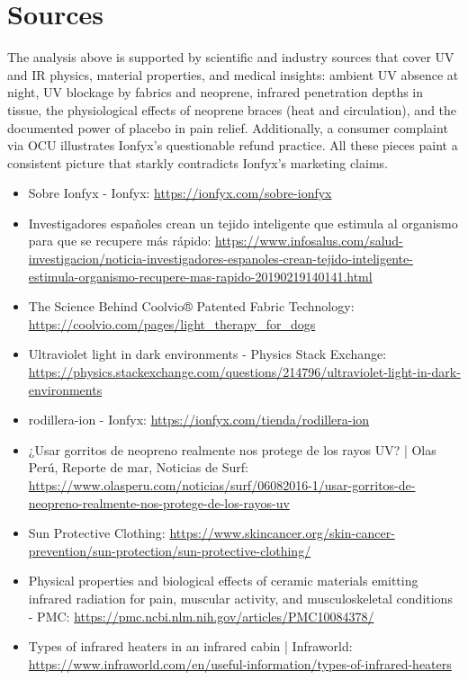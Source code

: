 \documentclass{article}
\begin{document}
\section*{Sources}
The analysis above is supported by scientific and industry sources that cover UV and IR physics, material properties, and medical insights: ambient UV absence at night, UV blockage by fabrics and neoprene, infrared penetration depths in tissue, the physiological effects of neoprene braces (heat and circulation), and the documented power of placebo in pain relief. Additionally, a consumer complaint via OCU illustrates Ionfyx's questionable refund practice. All these pieces paint a consistent picture that starkly contradicts Ionfyx's marketing claims.

\begin{itemize}
    \item Sobre Ionfyx - Ionfyx: \url{https://ionfyx.com/sobre-ionfyx}
    \item Investigadores españoles crean un tejido inteligente que estimula al organismo para que se recupere más rápido: \url{https://www.infosalus.com/salud-investigacion/noticia-investigadores-espanoles-crean-tejido-inteligente-estimula-organismo-recupere-mas-rapido-20190219140141.html}
    \item The Science Behind Coolvio® Patented Fabric Technology: \url{https://coolvio.com/pages/light_therapy_for_dogs}
    \item Ultraviolet light in dark environments - Physics Stack Exchange: \url{https://physics.stackexchange.com/questions/214796/ultraviolet-light-in-dark-environments}
    \item rodillera-ion - Ionfyx: \url{https://ionfyx.com/tienda/rodillera-ion}
    \item ¿Usar gorritos de neopreno realmente nos protege de los rayos UV? | Olas Perú, Reporte de mar, Noticias de Surf: \url{https://www.olasperu.com/noticias/surf/06082016-1/usar-gorritos-de-neopreno-realmente-nos-protege-de-los-rayos-uv}
    \item Sun Protective Clothing: \url{https://www.skincancer.org/skin-cancer-prevention/sun-protection/sun-protective-clothing/}
    \item Physical properties and biological effects of ceramic materials emitting infrared radiation for pain, muscular activity, and musculoskeletal conditions - PMC: \url{https://pmc.ncbi.nlm.nih.gov/articles/PMC10084378/}
    \item Types of infrared heaters in an infrared cabin | Infraworld: \url{https://www.infraworld.com/en/useful-information/types-of-infrared-heaters}

\end{itemize}
\end{document}
